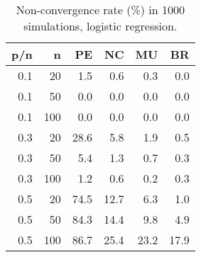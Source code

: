 \begin{table}[ht]
\centering
\begin{tabular}{rrrrrr}
  \hline
p/n & n & PE & NC & MU & BR \\ 
  \hline
0.1 & 20 & 1.5 & 0.6 & 0.3 & 0.0 \\ 
  0.1 & 50 & 0.0 & 0.0 & 0.0 & 0.0 \\ 
  0.1 & 100 & 0.0 & 0.0 & 0.0 & 0.0 \\ 
  0.3 & 20 & 28.6 & 5.8 & 1.9 & 0.5 \\ 
  0.3 & 50 & 5.4 & 1.3 & 0.7 & 0.3 \\ 
  0.3 & 100 & 1.2 & 0.6 & 0.2 & 0.3 \\ 
  0.5 & 20 & 74.5 & 12.7 & 6.3 & 1.0 \\ 
  0.5 & 50 & 84.3 & 14.4 & 9.8 & 4.9 \\ 
  0.5 & 100 & 86.7 & 25.4 & 23.2 & 17.9 \\ 
   \hline
\end{tabular}
\caption{Non-convergence rate (\%) in 1000 simulations, logistic regression.} 
\label{tab:binomialmoderatemissing}
\end{table}
